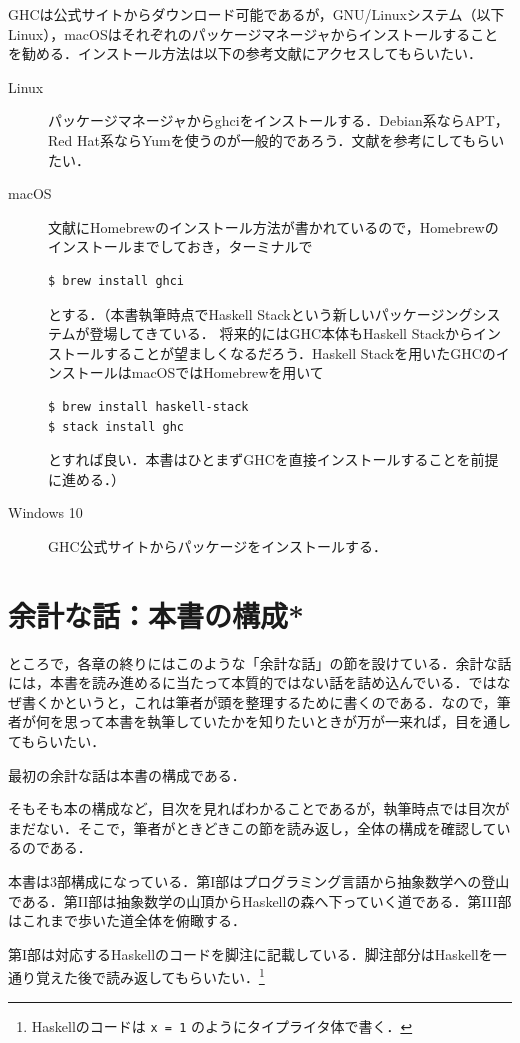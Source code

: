 \documentclass[a4paper]{jsbook}
\newcommand{\programminglanguage}[1]{\textsf{#1}}
\newcommand{\haskell}{\programminglanguage{Haskell}}
\newcommand{\code}[1]{\texttt{#1}}
\begin{document}
GHCは公式サイト\cite{haskellplatform}からダウンロード可能であるが，GNU/Linuxシステム（以下Linux），macOSはそれぞれのパッケージマネージャからインストールすることを勧める．インストール方法は以下の参考文献にアクセスしてもらいたい．
\begin{description}
\item[Linux] パッケージマネージャからghciをインストールする．Debian系ならAPT，Red Hat系ならYumを使うのが一般的であろう．文献\cite{linux}を参考にしてもらいたい．
\item[macOS] 文献\cite{osx}にHomebrewのインストール方法が書かれているので，Homebrewのインストールまでしておき，ターミナルで
\begin{verbatim}
$ brew install ghci
\end{verbatim} %
とする．（本書執筆時点でHaskell Stackという新しいパッケージングシステムが登場してきている．
将来的にはGHC本体もHaskell Stackからインストールすることが望ましくなるだろう．Haskell Stackを用いたGHCのインストールはmacOSではHomebrewを用いて
\begin{verbatim}
$ brew install haskell-stack
$ stack install ghc
\end{verbatim} %
とすれば良い．本書はひとまずGHCを直接インストールすることを前提に進める．）
\item[Windows 10] GHC公式サイト\cite{haskellplatform}からパッケージをインストールする．
\end{description}

\section{余計な話：本書の構成*}

ところで，各章の終りにはこのような「余計な話」の節を設けている．余計な話には，本書を読み進めるに当たって本質的ではない話を詰め込んでいる．ではなぜ書くかというと，これは筆者が頭を整理するために書くのである．なので，筆者が何を思って本書を執筆していたかを知りたいときが万が一来れば，目を通してもらいたい．

最初の余計な話は本書の構成である．

そもそも本の構成など，目次を見ればわかることであるが，執筆時点では目次がまだない．そこで，筆者がときどきこの節を読み返し，全体の構成を確認しているのである．

本書は3部構成になっている．第I部はプログラミング言語から抽象数学への登山である．第II部は抽象数学の山頂から\haskell の森へ下っていく道である．第III部はこれまで歩いた道全体を俯瞰する．

第I部は対応する\haskell のコードを脚注に記載している．脚注部分は\haskell を一通り覚えた後で読み返してもらいたい．\footnote{\haskell のコードは \code{x = 1} のようにタイプライタ体で書く．}
\end{document}
